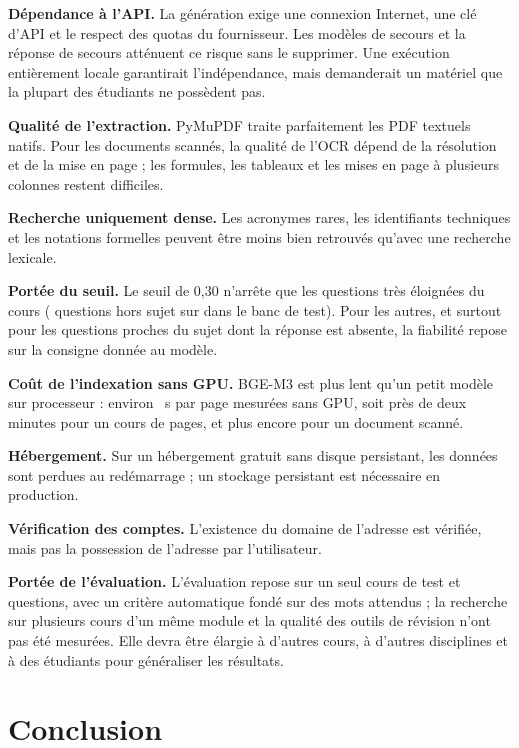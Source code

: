 \documentclass[12pt,a4paper,oneside]{report}
\begin{document}
\textbf{Dépendance à l'API.} La génération exige une connexion Internet, une clé d'API et le respect des quotas du fournisseur. Les modèles de secours et la réponse de secours atténuent ce risque sans le supprimer. Une exécution entièrement locale garantirait l'indépendance, mais demanderait un matériel que la plupart des étudiants ne possèdent pas.

\textbf{Qualité de l'extraction.} PyMuPDF traite parfaitement les PDF textuels natifs. Pour les documents scannés, la qualité de l'OCR dépend de la résolution et de la mise en page ; les formules, les tableaux et les mises en page à plusieurs colonnes restent difficiles.

\textbf{Recherche uniquement dense.} Les acronymes rares, les identifiants techniques et les notations formelles peuvent être moins bien retrouvés qu'avec une recherche lexicale.

\textbf{Portée du seuil.} Le seuil de 0,30 n'arrête que les questions très éloignées du cours (\SeuilHorsRefus{} questions hors sujet sur \SeuilHorsN{} dans le banc de test). Pour les autres, et surtout pour les questions proches du sujet dont la réponse est absente, la fiabilité repose sur la consigne donnée au modèle.

\textbf{Coût de l'indexation sans GPU.} BGE-M3 est plus lent qu'un petit modèle sur processeur : environ \IdxParPage~s par page mesurées sans GPU, soit près de deux minutes pour un cours de \IdxPages{} pages, et plus encore pour un document scanné.

\textbf{Hébergement.} Sur un hébergement gratuit sans disque persistant, les données sont perdues au redémarrage ; un stockage persistant est nécessaire en production.

\textbf{Vérification des comptes.} L'existence du domaine de l'adresse est vérifiée, mais pas la possession de l'adresse par l'utilisateur.

\textbf{Portée de l'évaluation.} L'évaluation repose sur un seul cours de test et \RechN{} questions, avec un critère automatique fondé sur des mots attendus ; la recherche sur plusieurs cours d'un même module et la qualité des outils de révision n'ont pas été mesurées. Elle devra être élargie à d'autres cours, à d'autres disciplines et à des étudiants pour généraliser les résultats.

\chapter{Conclusion}
\end{document}
